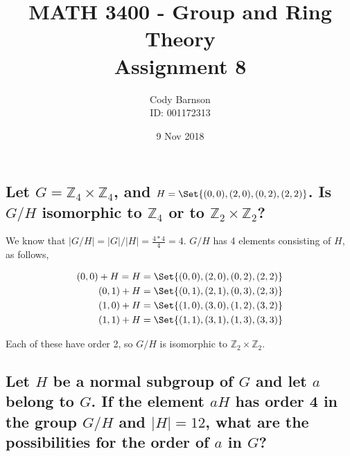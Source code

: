\documentclass{article}
\begin{document}
    
  \title{MATH 3400 - Group and Ring Theory\\Assignment 8}
  \author{Cody Barnson\\ ID: 001172313}
  \date{9 Nov 2018}
  \maketitle
  \newpage
  
  
  
\section*{}
\subsection{Let $G = \mathbb{Z}_4 \times \mathbb{Z}_4$, and $H = \Set{(0,0),(2,0),(0,2),(2,2)}$.  Is $G/H$ isomorphic to $\mathbb{Z}_4$ or to $\mathbb{Z}_2 \times \mathbb{Z}_2$?}

We know that $|G/H| = |G|/|H| = \frac{4 * 4}{4} = 4$.  $G/H$ has 4 elements consisting of $H$, as follows,

\begin{align*}
    (0, 0) + H = H &= \Set{(0, 0), (2, 0), (0, 2), (2, 2)} \\
    (0, 1) + H &= \Set{(0, 1), (2,1), (0,3), (2,3)} \\
    (1, 0) + H &= \Set{(1,0),(3,0),(1,2),(3,2)} \\
    (1, 1) + H &= \Set{(1,1),(3,1),(1,3),(3,3)} \\
\end{align*}

Each of these have order 2, so $G/H$ is isomorphic to $\mathbb{Z}_2 \times \mathbb{Z}_2$.

\subsection{Let $H$ be a normal subgroup of $G$ and let $a$ belong to $G$.  If the element $aH$ has order 4 in the group $G/H$ and $|H| = 12$, what are the possibilities for the order of $a$ in $G$?}
\end{document}
